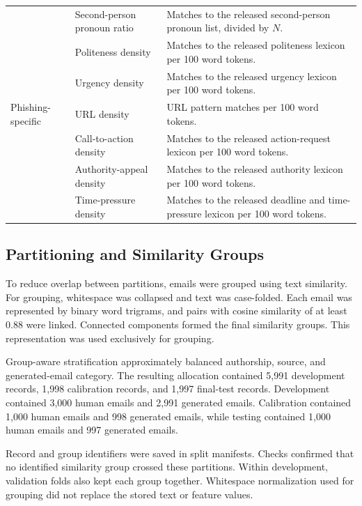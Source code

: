 \documentclass[conference]{IEEEtran}
\begin{document}
\begin{table}[!tp]
\begin{tabularx}{\textwidth}{
    @{}L{0.14\textwidth}L{0.25\textwidth}Y@{}
}
& Second-person pronoun ratio
& Matches to the released second-person pronoun list, divided by $N$. \\

& Politeness density
& Matches to the released politeness lexicon per 100 word tokens. \\

& Urgency density
& Matches to the released urgency lexicon per 100 word tokens. \\

\midrule

Phishing-specific
& URL density
& URL pattern matches per 100 word tokens. \\

& Call-to-action density
& Matches to the released action-request lexicon per 100 word tokens. \\

& Authority-appeal density
& Matches to the released authority lexicon per 100 word tokens. \\

& Time-pressure density
& Matches to the released deadline and time-pressure lexicon
per 100 word tokens. \\

\bottomrule
\end{tabularx}
\end{table}

\subsection{Partitioning and Similarity Groups}

To reduce overlap between partitions, emails were grouped using
text similarity. For grouping, whitespace was collapsed and text
was case-folded. Each email was represented by binary word
trigrams, and pairs with cosine similarity of at least 0.88 were
linked. Connected components formed the final similarity groups.
This representation was used exclusively for grouping.

Group-aware stratification approximately balanced authorship,
source, and generated-email category. The resulting allocation
contained 5,991 development records, 1,998 calibration records,
and 1,997 final-test records. Development contained 3,000 human
emails and 2,991 generated emails. Calibration contained 1,000
human emails and 998 generated emails, while testing contained
1,000 human emails and 997 generated emails.

Record and group identifiers were saved in split manifests.
Checks confirmed that no identified similarity group crossed
these partitions. Within development, validation folds also kept
each group together. Whitespace normalization used for grouping
did not replace the stored text or feature values.
\end{document}
